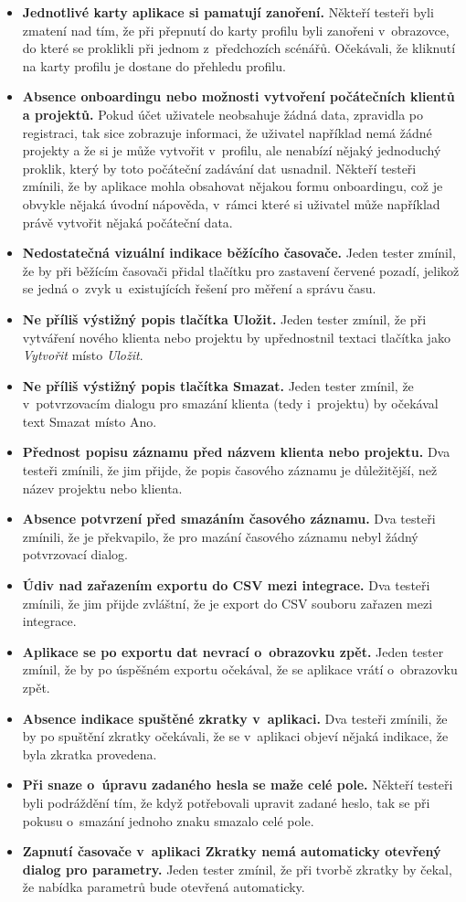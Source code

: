 \begin{itemize}
\item\textbf{Jednotlivé karty aplikace si pamatují zanoření.} Někteří testeři byli zmatení nad tím, že při přepnutí do karty profilu byli zanořeni v~obrazovce, do které se proklikli při jednom z~předchozích scénářů. Očekávali, že kliknutí na karty profilu je dostane do přehledu profilu.
\item\textbf{Absence onboardingu nebo možnosti vytvoření počátečních klientů a projektů.} Pokud účet uživatele neobsahuje žádná data, zpravidla po registraci, tak sice zobrazuje informaci, že uživatel například nemá žádné projekty a že si je může vytvořit v~profilu, ale nenabízí nějaký jednoduchý proklik, který by toto počáteční zadávání dat usnadnil. Někteří testeři zmínili, že by aplikace mohla obsahovat nějakou formu onboardingu, což je obvykle nějaká úvodní nápověda, v~rámci které si uživatel může například právě vytvořit nějaká počáteční data.
\item\textbf{Nedostatečná vizuální indikace běžícího časovače.} Jeden tester zmínil, že by při běžícím časovači přidal tlačítku pro zastavení červené pozadí, jelikož se jedná o~zvyk u~existujících řešení pro měření a správu času.
\item\textbf{Ne příliš výstižný popis tlačítka Uložit.} Jeden tester zmínil, že při vytváření nového klienta nebo projektu by upřednostnil textaci tlačítka jako \emph{Vytvořit} místo \emph{Uložit}.
\item\textbf{Ne příliš výstižný popis tlačítka Smazat.} Jeden tester zmínil, že v~potvrzovacím dialogu pro smazání klienta (tedy i~projektu) by očekával text Smazat místo Ano.
\item\textbf{Přednost popisu záznamu před názvem klienta nebo projektu.} Dva testeři zmínili, že jim přijde, že popis časového záznamu je důležitější, než název projektu nebo klienta.
\item\textbf{Absence potvrzení před smazáním časového záznamu.} Dva testeři zmínili, že je překvapilo, že pro mazání časového záznamu nebyl žádný potvrzovací dialog.
\item\textbf{Údiv nad zařazením exportu do CSV mezi integrace.} Dva testeři zmínili, že jim přijde zvláštní, že je export do CSV souboru zařazen mezi integrace.
\item\textbf{Aplikace se po exportu dat nevrací o~obrazovku zpět.} Jeden tester zmínil, že by po úspěšném exportu očekával, že se aplikace vrátí o~obrazovku zpět.
\item\textbf{Absence indikace spuštěné zkratky v~aplikaci.} Dva testeři zmínili, že by po spuštění zkratky očekávali, že se v~aplikaci objeví nějaká indikace, že byla zkratka provedena.
\item\textbf{Při snaze o~úpravu zadaného hesla se maže celé pole.} Někteří testeři byli podráždění tím, že když potřebovali upravit zadané heslo, tak se při pokusu o~smazání jednoho znaku smazalo celé pole.
\item\textbf{Zapnutí časovače v~aplikaci Zkratky nemá automaticky otevřený dialog pro parametry.} Jeden tester zmínil, že při tvorbě zkratky by čekal, že nabídka parametrů bude otevřená automaticky.
\end{itemize}

